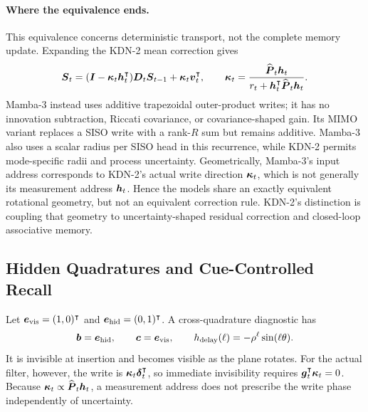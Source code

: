 \documentclass[11pt,letterpaper,logo]{yalearxiv}
\begin{document}
\paragraph{Where the equivalence ends.}
This equivalence concerns deterministic transport, not the complete memory update. Expanding the
KDN-2 mean correction gives
\begin{equation}
  \boldsymbol{S}_t
  =
  (\boldsymbol{I}-\boldsymbol{\kappa}_t\boldsymbol{h}_t^{\intercal})
  \boldsymbol{D}_t\boldsymbol{S}_{t-1}
  +\boldsymbol{\kappa}_t\boldsymbol{v}_t^{\intercal},
  \qquad
  \boldsymbol{\kappa}_t
  =
  \frac{\widehat{\boldsymbol{P}}_t\boldsymbol{h}_t}
  {r_t+\boldsymbol{h}_t^{\intercal}\widehat{\boldsymbol{P}}_t\boldsymbol{h}_t}.
  \label{eq:kdn2-vs-mamba3-update}
\end{equation}
Mamba-3 instead uses additive trapezoidal outer-product writes; it has no innovation subtraction,
Riccati covariance, or covariance-shaped gain. Its MIMO variant replaces a SISO write with a
rank-$R$ sum but remains additive. Mamba-3 also uses a scalar radius per SISO head in this
recurrence, while KDN-2 permits mode-specific radii and process uncertainty. Geometrically,
Mamba-3's input address corresponds to KDN-2's actual write direction $\boldsymbol{\kappa}_t$, which is
not generally its measurement address $\boldsymbol{h}_t$. Hence the models share an exactly equivalent
rotational geometry, but not an equivalent correction rule. KDN-2's distinction is coupling that
geometry to uncertainty-shaped residual correction and closed-loop associative memory.

\subsection{Hidden Quadratures and Cue-Controlled Recall}
\label{sec:kdn2-observability}

Let
$\boldsymbol{e}_{\mathrm{vis}}=(1,0)^{\intercal}$ and
$\boldsymbol{e}_{\mathrm{hid}}=(0,1)^{\intercal}$. A cross-quadrature diagnostic has
\begin{equation}
  \boldsymbol{b}=\boldsymbol{e}_{\mathrm{hid}},
  \qquad
  \boldsymbol{c}=\boldsymbol{e}_{\mathrm{vis}},
  \qquad
  h_{\mathrm{delay}}(\ell)
  =
  -\rho^\ell\sin(\ell\theta).
  \label{eq:kdn2-delayed-phase}
\end{equation}
It is invisible at insertion and becomes visible as the plane rotates. For the actual filter,
however, the write is $\boldsymbol{\kappa}_t\boldsymbol{\delta}_t^{\intercal}$, so immediate invisibility requires
$\boldsymbol{g}_t^{\intercal}\boldsymbol{\kappa}_t=0$. Because
$\boldsymbol{\kappa}_t\propto\widehat{\boldsymbol{P}}_t\boldsymbol{h}_t$, a measurement address does not prescribe the
write phase independently of uncertainty.
\end{document}
